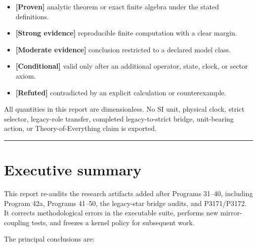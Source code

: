 \documentclass[11pt,a4paper,openany]{report}
\newcommand{\statusProven}{\textcolor{fingreen}{[Proven]}}
\newcommand{\statusStrong}{\textcolor{finblue}{[Strong evidence]}}
\newcommand{\statusModerate}{\textcolor{finviolet}{[Moderate evidence]}}
\newcommand{\statusConditional}{\textcolor{finorange}{[Conditional]}}
\newcommand{\statusRefuted}{\textcolor{finred}{[Refuted]}}
\begin{document}
\begin{itemize}
\item 
\textbf{\statusProven{}} analytic theorem or exact finite algebra under the stated definitions.

\item 
\textbf{\statusStrong{}} reproducible finite computation with a clear margin.

\item 
\textbf{\statusModerate{}} conclusion restricted to a declared model class.

\item 
\textbf{\statusConditional{}} valid only after an additional operator, state, clock, or sector axiom.

\item 
\textbf{\statusRefuted{}} contradicted by an explicit calculation or counterexample.

\end{itemize}

All quantities in this report are dimensionless. No SI unit, physical clock, strict selector, legacy-role transfer, completed legacy-to-strict bridge, unit-bearing action, or Theory-of-Everything claim is exported.

\par\medskip\hrule\medskip

\chapter{Executive summary}

This report re-audits the research artifacts added after Programs 31–40, including Program 42a, Programs 41–50, the legacy-star bridge audits, and P3171/\allowbreak{}P3172. It corrects methodological errors in the executable suite, performs new mirror-coupling tests, and freezes a kernel policy for subsequent work.

The principal conclusions are:
\end{document}
